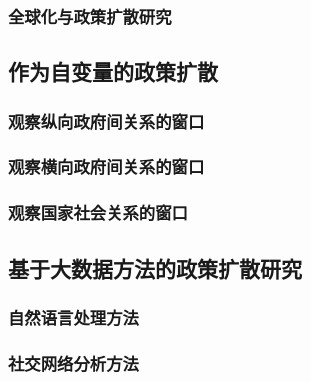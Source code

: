 \documentclass[
  12pt,
]{ctexart}
\begin{document}
\hypertarget{ux5168ux7403ux5316ux4e0eux653fux7b56ux6269ux6563ux7814ux7a76}{%
\subsubsection{全球化与政策扩散研究}\label{ux5168ux7403ux5316ux4e0eux653fux7b56ux6269ux6563ux7814ux7a76}}

\hypertarget{ux4f5cux4e3aux81eaux53d8ux91cfux7684ux653fux7b56ux6269ux6563}{%
\subsection{作为自变量的政策扩散}\label{ux4f5cux4e3aux81eaux53d8ux91cfux7684ux653fux7b56ux6269ux6563}}

\hypertarget{ux89c2ux5bdfux7eb5ux5411ux653fux5e9cux95f4ux5173ux7cfbux7684ux7a97ux53e3}{%
\subsubsection{观察纵向政府间关系的窗口}\label{ux89c2ux5bdfux7eb5ux5411ux653fux5e9cux95f4ux5173ux7cfbux7684ux7a97ux53e3}}

\hypertarget{ux89c2ux5bdfux6a2aux5411ux653fux5e9cux95f4ux5173ux7cfbux7684ux7a97ux53e3}{%
\subsubsection{观察横向政府间关系的窗口}\label{ux89c2ux5bdfux6a2aux5411ux653fux5e9cux95f4ux5173ux7cfbux7684ux7a97ux53e3}}

\hypertarget{ux89c2ux5bdfux56fdux5bb6ux793eux4f1aux5173ux7cfbux7684ux7a97ux53e3}{%
\subsubsection{观察国家社会关系的窗口}\label{ux89c2ux5bdfux56fdux5bb6ux793eux4f1aux5173ux7cfbux7684ux7a97ux53e3}}

\hypertarget{ux57faux4e8eux5927ux6570ux636eux65b9ux6cd5ux7684ux653fux7b56ux6269ux6563ux7814ux7a76}{%
\subsection{基于大数据方法的政策扩散研究}\label{ux57faux4e8eux5927ux6570ux636eux65b9ux6cd5ux7684ux653fux7b56ux6269ux6563ux7814ux7a76}}

\hypertarget{ux81eaux7136ux8bedux8a00ux5904ux7406ux65b9ux6cd5}{%
\subsubsection{自然语言处理方法}\label{ux81eaux7136ux8bedux8a00ux5904ux7406ux65b9ux6cd5}}

\hypertarget{ux793eux4ea4ux7f51ux7edcux5206ux6790ux65b9ux6cd5}{%
\subsubsection{社交网络分析方法}\label{ux793eux4ea4ux7f51ux7edcux5206ux6790ux65b9ux6cd5}}
\end{document}
